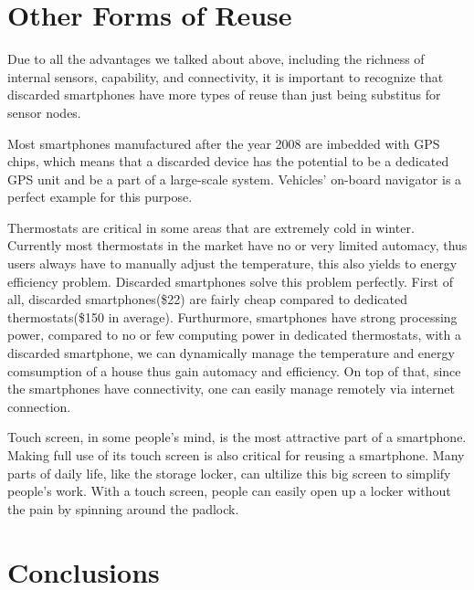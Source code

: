\section{Other Forms of Reuse}
\label{sec-other}

Due to all the advantages we talked about above, including the richness of internal sensors, capability, and connectivity, it is important to recognize that discarded smartphones have more types of reuse than just being substitus for sensor nodes.


Most smartphones manufactured after the year 2008 are imbedded with GPS chips, which means that a discarded device has the potential to be a dedicated GPS unit and be a part of  a large-scale system. Vehicles' on-board navigator is a perfect example for this purpose. 


Thermostats are critical in some areas that are extremely cold in winter. Currently most thermostats in the market have no or very limited automacy, thus users always have to manually adjust the temperature, this also yields to energy efficiency problem.  Discarded smartphones solve this problem perfectly. First of all, discarded smartphones(\$22) are fairly cheap compared to dedicated thermostats(\$150 in average). Furthurmore, smartphones have strong processing power, compared to no or few computing power in dedicated thermostats, with a discarded smartphone, we can dynamically manage the temperature and energy comsumption of a house thus gain automacy and efficiency. On top of that, since the smartphones have connectivity, one can easily manage remotely via internet connection. 


Touch screen, in some people's mind, is the most attractive part of a smartphone. Making full use of its touch screen is also critical for reusing a smartphone. Many parts of daily life, like the storage locker, can ultilize this big screen to simplify people's work. With a touch screen, people can easily open up a locker without the pain by spinning around the padlock. 

\section{Conclusions}
\label{sec-conclusion}
